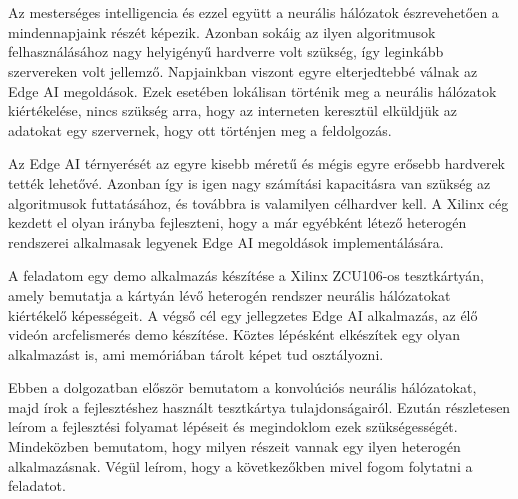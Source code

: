 \chapter{\bevezetes}

Az mesterséges intelligencia és ezzel együtt a neurális hálózatok észrevehetően a mindennapjaink részét képezik. Azonban sokáig az ilyen algoritmusok felhasználásához nagy helyigényű hardverre volt szükség, így leginkább szervereken volt jellemző. Napjainkban viszont egyre elterjedtebbé válnak az Edge AI megoldások. Ezek esetében lokálisan történik meg a neurális hálózatok kiértékelése, nincs szükség arra, hogy az interneten keresztül elküldjük az adatokat egy szervernek, hogy ott történjen meg a feldolgozás.

Az Edge AI térnyerését az egyre kisebb méretű és mégis egyre erősebb hardverek tették lehetővé. Azonban így is igen nagy számítási kapacitásra van szükség az algoritmusok futtatásához, és továbbra is valamilyen célhardver kell. A Xilinx cég kezdett el olyan irányba fejleszteni, hogy a már egyébként létező heterogén rendszerei alkalmasak legyenek Edge AI megoldások implementálására.

A feladatom egy demo alkalmazás készítése a Xilinx ZCU106-os tesztkártyán, amely bemutatja a kártyán lévő heterogén rendszer neurális hálózatokat kiértékelő képességeit. A végső cél egy jellegzetes Edge AI alkalmazás, az élő videón arcfelismerés demo készítése. Köztes lépésként elkészítek egy olyan alkalmazást is, ami memóriában tárolt képet tud osztályozni.

Ebben a dolgozatban először bemutatom a konvolúciós neurális hálózatokat, majd írok a fejlesztéshez használt tesztkártya tulajdonságairól. Ezután részletesen leírom a fejlesztési folyamat lépéseit és megindoklom ezek szükségességét. Mindeközben bemutatom, hogy milyen részeit vannak egy ilyen heterogén alkalmazásnak. Végül leírom, hogy a következőkben mivel fogom folytatni a feladatot.
